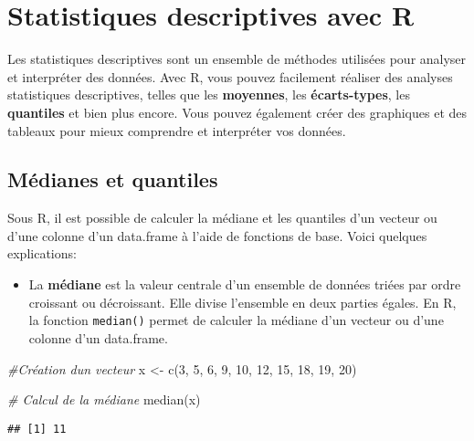 \documentclass[
]{article}
\newenvironment{Shaded}{\begin{snugshade}}{\end{snugshade}}
\newcommand{\CommentTok}[1]{\textcolor[rgb]{0.56,0.35,0.01}{\textit{#1}}}
\newcommand{\DecValTok}[1]{\textcolor[rgb]{0.00,0.00,0.81}{#1}}
\newcommand{\FunctionTok}[1]{\textcolor[rgb]{0.00,0.00,0.00}{#1}}
\newcommand{\NormalTok}[1]{#1}
\newcommand{\OtherTok}[1]{\textcolor[rgb]{0.56,0.35,0.01}{#1}}
\providecommand{\tightlist}{%
  \setlength{\itemsep}{0pt}\setlength{\parskip}{0pt}}
\begin{document}
\hypertarget{statistiques-descriptives-avec-r}{%
\section{Statistiques descriptives avec R}\label{statistiques-descriptives-avec-r}}

Les statistiques descriptives sont un ensemble de méthodes utilisées pour analyser et interpréter des données. Avec R, vous pouvez facilement réaliser des analyses statistiques descriptives, telles que les \textbf{moyennes}, les \textbf{écarts-types}, les \textbf{quantiles} et bien plus encore. Vous pouvez également créer des graphiques et des tableaux pour mieux comprendre et interpréter vos données.

\hypertarget{muxe9dianes-et-quantiles}{%
\subsection{Médianes et quantiles}\label{muxe9dianes-et-quantiles}}

Sous R, il est possible de calculer la médiane et les quantiles d'un vecteur ou d'une colonne d'un data.frame à l'aide de fonctions de base. Voici quelques explications:

\begin{itemize}
\tightlist
\item
  La \textbf{médiane} est la valeur centrale d'un ensemble de données triées par ordre croissant ou décroissant. Elle divise l'ensemble en deux parties égales. En R, la fonction \texttt{median()} permet de calculer la médiane d'un vecteur ou d'une colonne d'un data.frame.
\end{itemize}

\begin{Shaded}
\begin{Highlighting}[]
\CommentTok{\#Création d\textquotesingle{}un vecteur}
\NormalTok{x }\OtherTok{\textless{}{-}} \FunctionTok{c}\NormalTok{(}\DecValTok{3}\NormalTok{, }\DecValTok{5}\NormalTok{, }\DecValTok{6}\NormalTok{, }\DecValTok{9}\NormalTok{, }\DecValTok{10}\NormalTok{, }\DecValTok{12}\NormalTok{, }\DecValTok{15}\NormalTok{, }\DecValTok{18}\NormalTok{, }\DecValTok{19}\NormalTok{, }\DecValTok{20}\NormalTok{)}

\CommentTok{\# Calcul de la médiane}
\FunctionTok{median}\NormalTok{(x)}
\end{Highlighting}
\end{Shaded}

\begin{verbatim}
## [1] 11
\end{verbatim}
\end{document}
